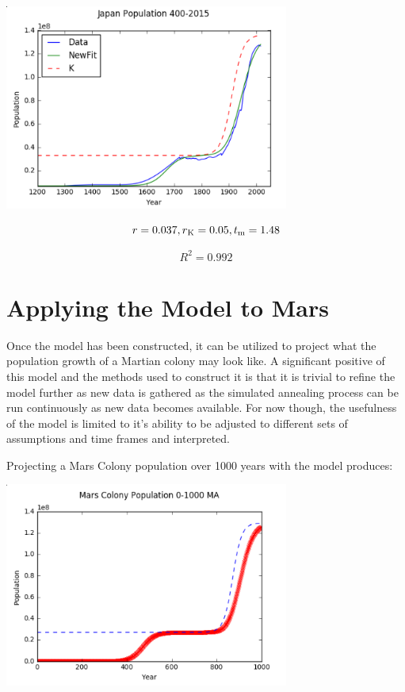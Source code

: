 \documentclass[12pt]{article}
\begin{document}
 \begin{minipage}{\textwidth}
		\centering
		\includegraphics[width=0.7\textwidth]{japanFit}
\end{minipage}\hfill
\begin{equation} 
r=0.037,r\textsubscript{K}=0.05,t\textsubscript{m}=1.48
\end{equation}


\begin{equation} R^2 = 0.992 \end{equation}


\section{Applying the Model to Mars}


Once the model has been constructed, it can be utilized to project what the population growth of a Martian colony may look like. A significant positive of this model and the methods used to construct it is that it is trivial to refine the model further as new data is gathered as the simulated annealing process can be run continuously as new data becomes available. For now though, the usefulness of the model is limited to it's ability to be adjusted to different sets of assumptions and time frames and interpreted.


Projecting a Mars Colony population over 1000 years with the model produces: 


\begin{minipage}{\textwidth}
		\centering
		\includegraphics[width=0.7\textwidth]{mars1}
\end{minipage}\hfill
\end{document}
